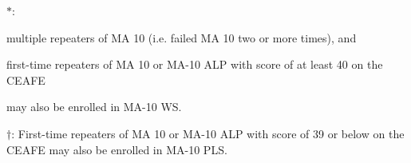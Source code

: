 \documentclass[12pt]{article}
\begin{document}
\begin{center}
\begin{tikzpicture}[scale=0.7,transform shape, font=\Large\sffamily]
\end{tikzpicture}

\parbox{0.915\textwidth}
{
\it
    \scriptsize 

    $\ast$: \begin{enumerate*}[label={(\roman*)}]
        \item multiple repeaters of MA 10 (i.e. failed MA 10 two or more times), and 
        \item first-time repeaters of MA 10 or MA-10 ALP with score of at least 40 on the CEAFE %
    \end{enumerate*}
    may also be enrolled in MA-10 WS.

$\dagger$: 
First-time repeaters of MA 10 or MA-10 ALP with score of 39 or below on the CEAFE may also be enrolled in MA-10 PLS. 

   
}
\end{center}


\vfill\null
\end{document}
